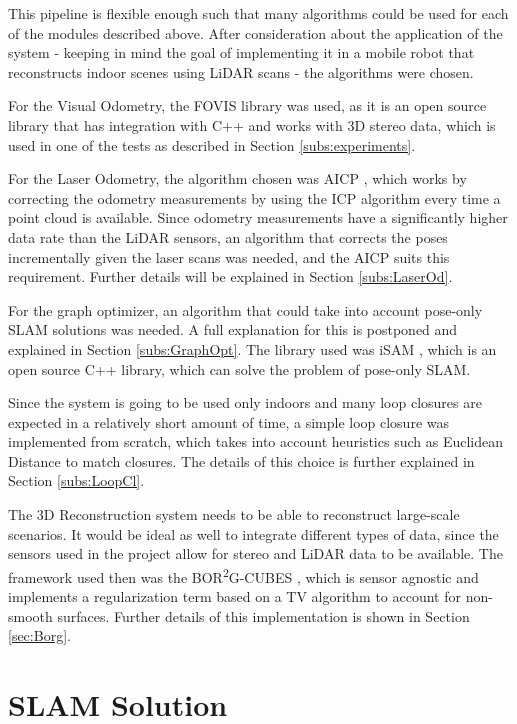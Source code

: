 \documentclass[11pt]{article}
\begin{document}
This pipeline is flexible enough such that many algorithms could be used for each of the modules described above. After consideration about the application of the system - keeping in mind the goal of implementing it in a mobile robot that reconstructs indoor scenes using LiDAR scans - the algorithms were chosen.
	
For the Visual Odometry, the FOVIS library \cite{fovis} was used, as it is an open source library that has integration with C++ and works with 3D stereo data, which is used in one of the tests as described in Section \ref{subs:experiments}.
	
For the Laser Odometry, the algorithm chosen was AICP \cite{7989547}, which works by correcting the odometry measurements by using the ICP algorithm every time a point cloud is available. Since odometry measurements have a significantly higher data rate than the LiDAR sensors, an algorithm that corrects the poses incrementally given the laser scans was needed, and the AICP suits this requirement. Further details will be explained in Section \ref{subs:LaserOd}.
	
For the graph optimizer, an algorithm that could take into account pose-only SLAM solutions was needed. A full explanation for this is postponed and explained in Section \ref{subs:GraphOpt}. The library used was iSAM \cite{Kaess08tro}, which is an open source C++ library, which can solve the problem of pose-only SLAM.
	
Since the system is going to be used only indoors and many loop closures are expected in a relatively short amount of time, a simple loop closure was implemented from scratch, which takes into account heuristics such as Euclidean Distance to match closures. The details of this choice is further explained in Section \ref{subs:LoopCl}.
	
The 3D Reconstruction system needs to be able to reconstruct large-scale scenarios. It would be ideal as well to integrate different types of data, since the sensors used in the project allow for stereo and LiDAR data to be available. The framework used then was the BOR\textsuperscript{2}G-CUBES \cite{TannerFSR2015}\cite{TannerArXiv2016}, which is sensor agnostic and implements a regularization term based on a TV algorithm to account for non-smooth surfaces. Further details of this implementation is shown in Section \ref{sec:Borg}.
		
	\newpage
	\section{SLAM Solution}
\end{document}
